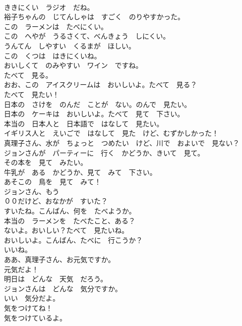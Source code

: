 \documentclass[8pt]{extreport}
\begin{document}
\begin{CJK}{UTF8}{min}
\\	ききにくい　ラジオ　だね。	
\\	裕子ちゃんの　じてんしゃは　すごく　のりやすかった。	
\\	この　ラーメンは　たべにくい。	
\\	この　へやが　うるさくて、べんきょう　しにくい。	
\\	うんてん　しやすい　くるまが　ほしい。	
\\	この　くつは　はきにくいね。	
\\	おいしくて　のみやすい　ワイン　ですね。	
\\	たべて　見る。	
\\	おお、この　アイスクリームは　おいしいよ。たべて　見る？	
\\	たべて　見たい！	
\\	日本の　さけを　のんだ　ことが　ない。のんで　見たい。	
\\	日本の　ケーキは　おいしいよ。たべて　見て　下さい。	
\\	本当の　日本人と　日本語で　はなして　見たい。	
\\	イギリス人と　えいごで　はなして　見た　けど、むずかしかった！	
\\	真理子さん、水が　ちょっと　つめたい　けど、川で　およいで　見ない？	
\\	ジョンさんが　パーティーに　行く　かどうか、きいて　見て。	
\\	その本を　見て　みたい。	
\\	牛乳が　ある　かどうか、見て　みて　下さい。	
\\	あそこの　鳥を　見て　みて！	
\\	ジョンさん、もう　
\\	００だけど、おなかが　すいた？	
\\	すいたね。こんばん、何を　たべようか。	
\\	本当の　ラーメンを　たべたこと、ある？	
\\	ないよ。おいしい？たべて　見たいね。	
\\	おいしいよ。こんばん、たべに　行こうか？	
\\	いいね。	
\\	ああ、真理子さん、お元気ですか。	
\\	元気だよ！	
\\	明日は　どんな　天気　だろう。	
\\	ジョンさんは　どんな　気分ですか。	
\\	いい　気分だよ。	
\\	気をつけてね！	
\\	気をつけているよ。	

\end{CJK}
\end{document}
